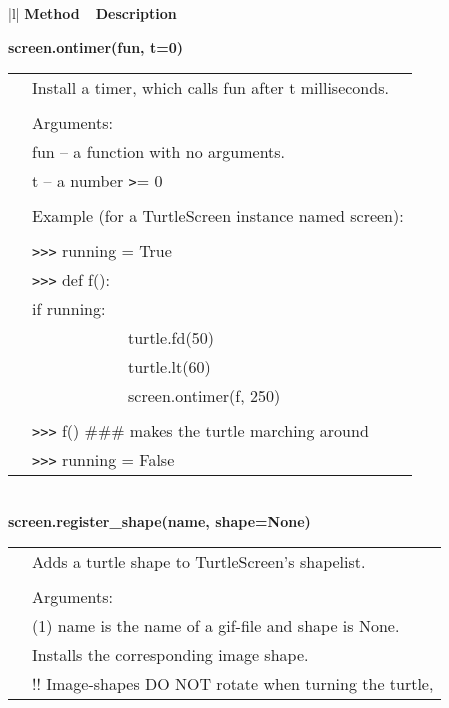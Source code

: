 \begin{center}
{\small
\begin{tabular}{|l|} \hline
{\bf Method~~Description}  \\ \hline\hline 




{\bf    screen.ontimer(fun, t=0)} \\
   \begin{tabular}{p{0.25in}p{4in}}
&        Install a timer, which calls fun after t milliseconds. \\
&  \\
&        Arguments: \\
&        fun -- a function with no arguments. \\
&        t -- a number \verb+>+= 0 \\
&  \\
&        Example (for a TurtleScreen instance named screen): \\
&  \\
&        \verb+>+\verb+>+\verb+>+ running = True \\
&        \verb+>+\verb+>+\verb+>+ def f(): \\
&                if running: \\
&                        ~~~~~~~~~~~~turtle.fd(50) \\
&                        ~~~~~~~~~~~~turtle.lt(60) \\
&                        ~~~~~~~~~~~~screen.ontimer(f, 250) \\
&  \\
&        \verb+>+\verb+>+\verb+>+ f()   \#\#\# makes the turtle marching around \\
&        \verb+>+\verb+>+\verb+>+ running = False \\
\end{tabular} \\ \hline
{\bf    screen.register\_shape(name, shape=None)} \\
   \begin{tabular}{p{0.25in}p{4in}}
&        Adds a turtle shape to TurtleScreen's shapelist. \\
&  \\
&        Arguments: \\
&        (1) name is the name of a gif-file and shape is None. \\
&            Installs the corresponding image shape. \\
&            !! Image-shapes DO NOT rotate when turning the turtle, \\

\end{tabular}
\end{tabular}}
\end{center}
